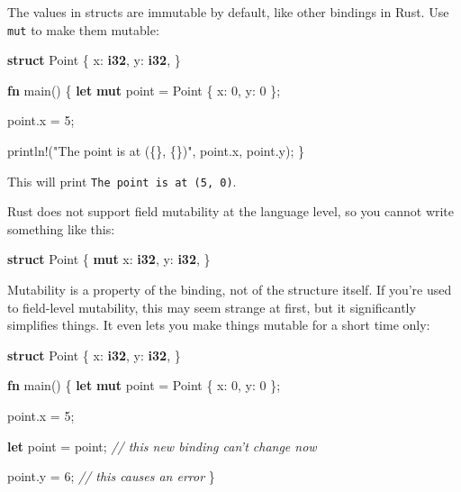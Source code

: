 \documentclass[a4paper,]{book}
\newenvironment{Shaded}{\begin{snugshade}}{\end{snugshade}}
\newcommand{\KeywordTok}[1]{\textcolor[rgb]{0.13,0.29,0.53}{\textbf{{#1}}}}
\newcommand{\DecValTok}[1]{\textcolor[rgb]{0.00,0.00,0.81}{{#1}}}
\newcommand{\StringTok}[1]{\textcolor[rgb]{0.31,0.60,0.02}{{#1}}}
\newcommand{\CommentTok}[1]{\textcolor[rgb]{0.56,0.35,0.01}{\textit{{#1}}}}
\newcommand{\OtherTok}[1]{\textcolor[rgb]{0.56,0.35,0.01}{{#1}}}
\newcommand{\NormalTok}[1]{{#1}}
\begin{document}
The values in structs are immutable by default, like other bindings in
Rust. Use \texttt{mut} to make them mutable:

\begin{Shaded}
\begin{Highlighting}[]
\KeywordTok{struct} \NormalTok{Point \{}
    \NormalTok{x: }\KeywordTok{i32}\NormalTok{,}
    \NormalTok{y: }\KeywordTok{i32}\NormalTok{,}
\NormalTok{\}}

\KeywordTok{fn} \NormalTok{main() \{}
    \KeywordTok{let} \KeywordTok{mut} \NormalTok{point = Point \{ x: }\DecValTok{0}\NormalTok{, y: }\DecValTok{0} \NormalTok{\};}

    \NormalTok{point.x = }\DecValTok{5}\NormalTok{;}

    \OtherTok{println!}\NormalTok{(}\StringTok{"The point is at (\{\}, \{\})"}\NormalTok{, point.x, point.y);}
\NormalTok{\}}
\end{Highlighting}
\end{Shaded}

This will print \texttt{The\ point\ is\ at\ (5,\ 0)}.

Rust does not support field mutability at the language level, so you
cannot write something like this:

\begin{Shaded}
\begin{Highlighting}[]
\KeywordTok{struct} \NormalTok{Point \{}
    \KeywordTok{mut} \NormalTok{x: }\KeywordTok{i32}\NormalTok{,}
    \NormalTok{y: }\KeywordTok{i32}\NormalTok{,}
\NormalTok{\}}
\end{Highlighting}
\end{Shaded}

Mutability is a property of the binding, not of the structure itself. If
you're used to field-level mutability, this may seem strange at first,
but it significantly simplifies things. It even lets you make things
mutable for a short time only:

\begin{Shaded}
\begin{Highlighting}[]
\KeywordTok{struct} \NormalTok{Point \{}
    \NormalTok{x: }\KeywordTok{i32}\NormalTok{,}
    \NormalTok{y: }\KeywordTok{i32}\NormalTok{,}
\NormalTok{\}}

\KeywordTok{fn} \NormalTok{main() \{}
    \KeywordTok{let} \KeywordTok{mut} \NormalTok{point = Point \{ x: }\DecValTok{0}\NormalTok{, y: }\DecValTok{0} \NormalTok{\};}

    \NormalTok{point.x = }\DecValTok{5}\NormalTok{;}

    \KeywordTok{let} \NormalTok{point = point; }\CommentTok{// this new binding can’t change now}

    \NormalTok{point.y = }\DecValTok{6}\NormalTok{; }\CommentTok{// this causes an error}
\NormalTok{\}}
\end{Highlighting}
\end{Shaded}
\end{document}
